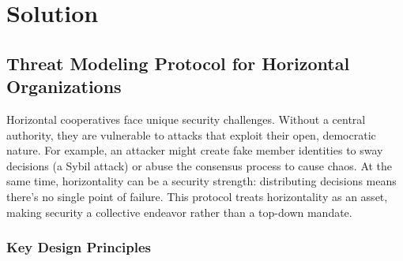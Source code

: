 
%

\chapter{Solution}
\label{cha:solution}


\glsresetall
 
\section{Threat Modeling Protocol for Horizontal Organizations}
\label{sec:protocol}

Horizontal cooperatives face unique security challenges. Without a central
authority, they are vulnerable to attacks that exploit their open, democratic
nature. For example, an attacker might create fake member identities to sway
decisions (a Sybil attack) or abuse the consensus process to cause chaos. At the
same time, horizontality can be a security strength: distributing decisions
means there's no single point of failure. This protocol treats horizontality
as an asset, making security a collective endeavor rather than a top-down
mandate.

\subsection{Key Design Principles}
\label{subsec:key_principles}

